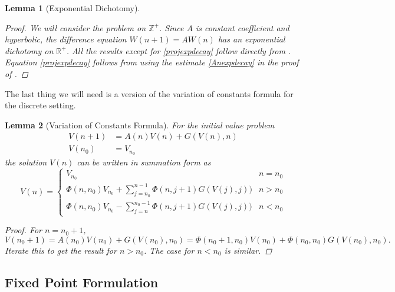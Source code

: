 \documentclass[12pt]{elsarticle}
\def\R{{\mathbb R}}
\def\Z{{\mathbb Z}}
\newtheorem{lemma}{Lemma}
\begin{document}
\begin{lemma}[Exponential Dichotomy]
\begin{proof}
We will consider the problem on $\Z^+$. Since $A$ is constant coefficient and hyperbolic, the difference equation $W(n+1) = A  W(n)$ has an exponential dichotomy on $\R^+$. All the results except for \eqref{projexpdecay} follow directly from \cite[Proposition 2.5]{Beyn1997}. Equation \eqref{projexpdecay} follows from using the estimate \eqref{Anexpdecay} in the proof of \cite[Proposition 2.5]{Beyn1997}.
\end{proof}
\end{lemma}

The last thing we will need is a version of the variation of constants formula for the discrete setting.

\begin{lemma}[Variation of Constants Formula]\label{VOC}
For the initial value problem
\begin{align*}
V(n+1) &= A(n) V(n) + G(V(n), n) \\
V(n_0) &= V_{n_0}
\end{align*}
the solution $V(n)$ can be written in summation form as 
\begin{equation}\label{VOCformula}
V(n) = 
\begin{cases}
V_{n_0} & n = n_0 \\
\Phi(n, n_0) V_{n_0} + \sum_{j = n_0}^{n-1} \Phi(n, j+1) G(V(j), j)) & n > n_0 \\
\Phi(n, n_0) V_{n_0} - \sum_{j = n}^{n_0-1} \Phi(n, j+1) G(V(j), j)) & n < n_0 
\end{cases}
\end{equation}
\begin{proof}
For $n = n_0 + 1$,
\[
V(n_0 + 1) = A(n_0) V(n_0) + G(V(n_0), n_0) = \Phi(n_0+1, n_0) V(n_0) + \Phi(n_0, n_0) G(V(n_0), n_0).
\]
Iterate this to get the result for $n > n_0$. The case for $n < n_0$ is similar.
\end{proof}
\end{lemma}

\subsection{Fixed Point Formulation}
\end{document}

